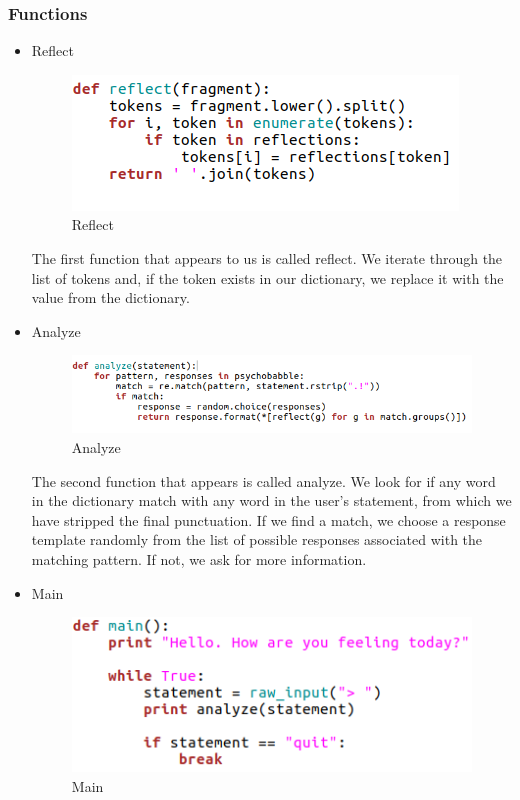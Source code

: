 \documentclass[12pt,twoside]{article}
\theoremstyle{plain}
\theoremstyle{definition}
\theoremstyle{remark}
\begin{document}
\subsubsection{Functions}
	\label{sec:functions}
\begin{itemize}
	
\item{Reflect}
		
\begin{figure}[h]
\centering
\includegraphics[scale=0.6]{./Pictures/reflect.png}
\caption{Reflect} 
\end{figure}

The first function that appears to us is called reflect. We iterate through the list of tokens and, if the token exists in our dictionary, we replace it with the value from the dictionary.

\item{Analyze}


\begin{figure}[h]
\centering
\includegraphics[scale=0.6]{./Pictures/analyze.png}
\caption{Analyze}
\label{fig:analyze}
\end{figure}

The second function that appears is called analyze. We look for if any word in the dictionary match with any word in the user's statement, from which we have stripped the final punctuation. If we find a match, we choose a response template randomly from the list of possible responses associated with the matching pattern. If not, we ask for more information.

\item{Main}

	
\begin{figure}[h]
\centering
\includegraphics[scale=0.6]{./Pictures/main.png}
\caption{Main}
\label{fig:main}


\end{figure}
\end{itemize}
\end{document}
